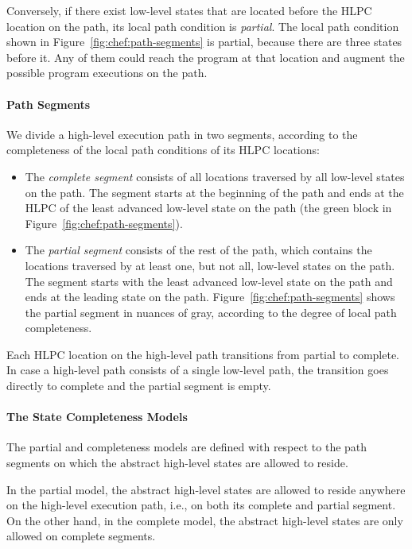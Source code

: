 Conversely, if there exist low-level states that are located before the HLPC location on the path, its local path condition is \emph{partial}.
%
The local path condition shown in Figure~\ref{fig:chef:path-segments} is partial, because there are three states before it.
%
Any of them could reach the program at that location and augment the possible program executions on the path.

\paragraph{Path Segments}

We divide a high-level execution path in two segments, according to the completeness of the local path conditions of its HLPC locations:
\begin{itemize}
\item The \emph{complete segment} consists of all locations traversed by all low-level states on the path.
%
The segment starts at the beginning of the path and ends at the HLPC of the least advanced low-level state on the path (the green block in Figure~\ref{fig:chef:path-segments}).
\item The \emph{partial segment} consists of the rest of the path, which contains the locations traversed by at least one, but not all, low-level states on the path.
%
The segment starts with the least advanced low-level state on the path and ends at the leading state on the path.  Figure~\ref{fig:chef:path-segments} shows the partial segment in nuances of gray, according to the degree of local path completeness.
\end{itemize}

Each HLPC location on the high-level path transitions from partial to complete.
%
In case a high-level path consists of a single low-level path, the transition goes directly to complete and the partial segment is empty.

\paragraph{The State Completeness Models}

The partial and completeness models are defined with respect to the path segments on which the abstract high-level states are allowed to reside.

In the partial model, the abstract high-level states are allowed to reside anywhere on the high-level execution path, i.e., on both its complete and partial segment.
%
On the other hand, in the complete model, the abstract high-level states are only allowed on complete segments.


